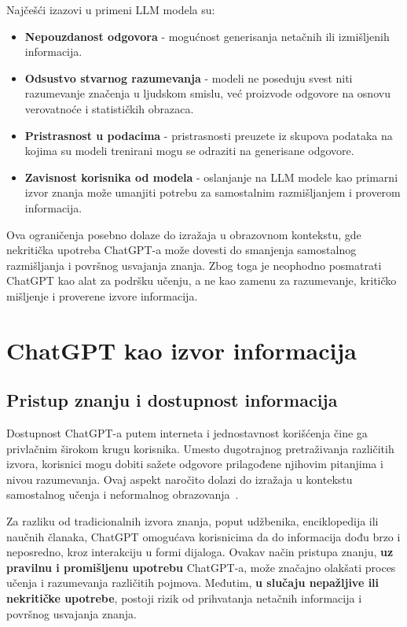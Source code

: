 \documentclass[a4paper, 12pt]{article}
\begin{document}
Najčešći izazovi u primeni LLM modela su:
\begin{itemize}
    \item \textbf{Nepouzdanost odgovora} - mogućnost generisanja netačnih ili izmišljenih informacija.
    \item \textbf{Odsustvo stvarnog razumevanja} - modeli ne poseduju svest niti razumevanje značenja u ljudskom smislu, već proizvode odgovore na osnovu verovatnoće i statističkih obrazaca.
    \item \textbf{Pristrasnost u podacima} - pristrasnosti preuzete iz skupova podataka na kojima su modeli trenirani mogu se odraziti na generisane odgovore.
    \item \textbf{Zavisnost korisnika od modela} - oslanjanje na LLM modele kao primarni izvor znanja može umanjiti potrebu za samostalnim razmišljanjem i proverom informacija.
\end{itemize}


Ova ograničenja posebno dolaze do izražaja u obrazovnom kontekstu, gde nekritička upotreba ChatGPT-a može dovesti do smanjenja samostalnog razmišljanja i površnog usvajanja znanja. Zbog toga je neophodno posmatrati ChatGPT kao alat za podršku učenju, a ne kao zamenu za razumevanje, kritičko mišljenje i proverene izvore informacija.


\section{ChatGPT kao izvor informacija}
\subsection{Pristup znanju i dostupnost informacija}

Dostupnost ChatGPT-a putem interneta i jednostavnost korišćenja čine ga privlačnim širokom krugu korisnika. Umesto dugotrajnog pretraživanja različitih izvora, korisnici mogu dobiti sažete odgovore prilagođene njihovim pitanjima i nivou razumevanja. Ovaj aspekt naročito dolazi do izražaja u kontekstu samostalnog učenja i neformalnog obrazovanja~\cite{openai2023}.

Za razliku od tradicionalnih izvora znanja, poput udžbenika, enciklopedija ili naučnih članaka, ChatGPT omogućava korisnicima da do informacija dođu brzo i neposredno, kroz interakciju u formi dijaloga. Ovakav način pristupa znanju, \textbf{uz pravilnu i promišljenu upotrebu} ChatGPT-a, može značajno olakšati proces učenja i razumevanja različitih pojmova. Međutim, \textbf{u slučaju nepažljive ili nekritičke upotrebe}, postoji rizik od prihvatanja netačnih informacija i površnog usvajanja znanja.
\end{document}
